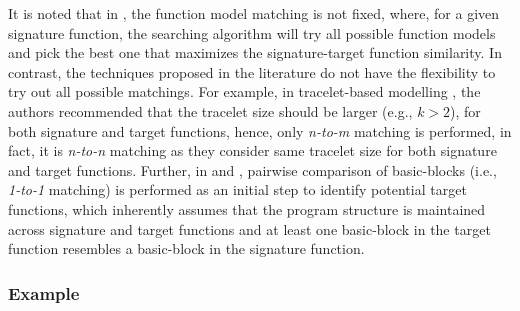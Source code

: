 It is noted that in \tool, the function model matching is not fixed, where, for a given signature function, the searching algorithm will try all possible function models and pick the best one that maximizes the signature-target function similarity. In contrast, the techniques proposed in the literature do not have the flexibility to try out all possible matchings. For example, in tracelet-based modelling \cite{david2014tracelet}, the authors recommended that the tracelet size should be larger (e.g., $k>2$), for both signature and target functions, hence, only \textit{n-to-m} matching is performed, in fact, it is \textit{n-to-n} matching as they consider same tracelet size for both signature and target functions. Further, in \cite{pewnycross} and \cite{luo2014semantics}, pairwise comparison of basic-blocks (i.e., \textit{1-to-1} matching) is performed as an initial step to identify potential target functions, which inherently assumes that the program structure is maintained across signature and target functions and at least one basic-block in the target function resembles a basic-block in the signature function.


\subsubsection{Example} \label{subsubsec:exp}


